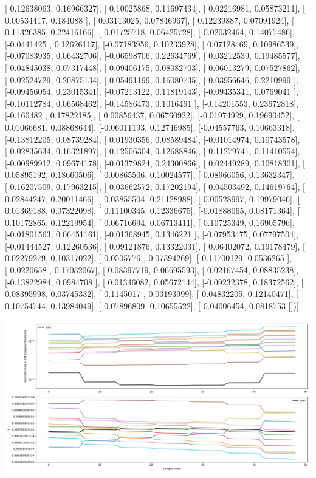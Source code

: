 \documentclass{article}
\begin{document}
       [ 0.12638063,  0.16966327],
       [ 0.10025868,  0.11697434],
       [ 0.02216981,  0.05873211],
       [ 0.00534417,  0.184088  ],
       [ 0.03113025,  0.07846967],
       [ 0.12239887,  0.07091924],
       [ 0.11326385,  0.22416166],
       [ 0.01725718,  0.06425728],
       [-0.02032464,  0.14077486],
       [-0.0441425 ,  0.12626117],
       [-0.07183956,  0.10233928],
       [ 0.07128469,  0.10986539],
       [-0.07083935,  0.06432706],
       [-0.06598706,  0.22634769],
       [ 0.03212539,  0.19485577],
       [-0.04845038,  0.07317448],
       [ 0.09406175,  0.08082703],
       [-0.06013279,  0.07527862],
       [-0.02524729,  0.20875134],
       [ 0.05491199,  0.16080735],
       [ 0.03956646,  0.2210999 ],
       [-0.09456054,  0.23015341],
       [-0.07213122,  0.11819143],
       [-0.09435341,  0.0769041 ],
       [-0.10112784,  0.06568462],
       [-0.14586473,  0.1016461 ],
       [-0.14201553,  0.23672818],
       [-0.160482  ,  0.17822185],
       [ 0.00856437,  0.06760922],
       [-0.01974929,  0.19690452],
       [ 0.01066681,  0.08868644],
       [-0.06011193,  0.12746985],
       [-0.04557763,  0.10663318],
       [-0.13812205,  0.08739284],
       [ 0.01930356,  0.08589484],
       [-0.01014974,  0.10743578],
       [-0.02835634,  0.16321897],
       [-0.12506304,  0.12688846],
       [-0.11279741,  0.11410554],
       [-0.00989912,  0.09674178],
       [-0.01379824,  0.24300866],
       [ 0.02449289,  0.10818301],
       [ 0.05895192,  0.18660506],
       [-0.00865506,  0.10024577],
       [-0.08966056,  0.13632347],
       [-0.16207509,  0.17963215],
       [ 0.03662572,  0.17202194],
       [ 0.04503492,  0.14619764],
       [ 0.02844247,  0.20011466],
       [ 0.03855504,  0.21128988],
       [-0.00528997,  0.19979046],
       [ 0.01369188,  0.07322098],
       [ 0.11100345,  0.12336675],
       [-0.01888065,  0.08171364],
       [ 0.10172865,  0.12219954],
       [-0.06716694,  0.06713411],
       [ 0.10725349,  0.16905796],
       [-0.01801563,  0.06451161],
       [-0.01368945,  0.1346221 ],
       [-0.07953475,  0.07797504],
       [-0.01444527,  0.12260536],
       [ 0.09121876,  0.13322031],
       [ 0.06402072,  0.19178479],
       [ 0.02279279,  0.10317022],
       [-0.0505776 ,  0.07394269],
       [ 0.11700129,  0.0536265 ],
       [-0.0220658 ,  0.17032067],
       [-0.08397719,  0.06695593],
       [-0.02167454,  0.08835238],
       [-0.13822984,  0.0984708 ],
       [ 0.01346082,  0.05672144],
       [-0.09232378,  0.18372562],
       [ 0.08395998,  0.03745332],
       [ 0.1145017 ,  0.03193999],
       [-0.04832205,  0.12140471],
       [ 0.10754744,  0.13984049],
       [ 0.07896809,  0.10655522],
       [ 0.04006454,  0.0818753 ]])]
\begin{center}
\includegraphics[scale=.9]{report_pickled_controls157/control_dpn_all.png}

\end{center}
\end{document}
